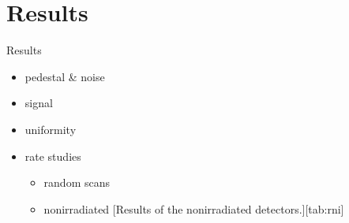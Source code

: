 \section{Results}
\begin{frame}{Results}

  \begin{itemize}
    \item pedestal \& noise
    \item signal
    \item uniformity
    \item rate studies
    \begin{itemize}
      \item random scans
      \item nonirradiated
      [Results of the nonirradiated detectors.][tab:rni]
    \end{itemize}

  \end{itemize}

\end{frame}
